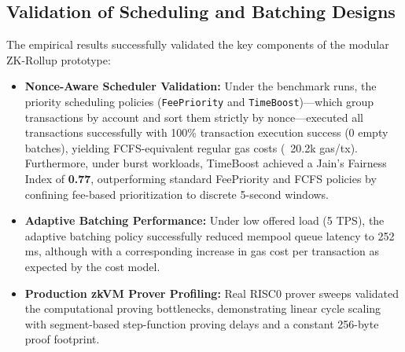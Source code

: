 \subsection{Validation of Scheduling and Batching Designs}
The empirical results successfully validated the key components of the modular ZK-Rollup prototype:
\begin{itemize}
    \item \textbf{Nonce-Aware Scheduler Validation:} Under the benchmark runs, the priority scheduling policies (\texttt{FeePriority} and \texttt{TimeBoost})—which group transactions by account and sort them strictly by nonce—executed all transactions successfully with 100\% transaction execution success (0 empty batches), yielding FCFS-equivalent regular gas costs (~20.2k gas/tx). Furthermore, under burst workloads, TimeBoost achieved a Jain's Fairness Index of \textbf{0.77}, outperforming standard FeePriority and FCFS policies by confining fee-based prioritization to discrete 5-second windows.
    \item \textbf{Adaptive Batching Performance:} Under low offered load (5 TPS), the adaptive batching policy successfully reduced mempool queue latency to 252 ms, although with a corresponding increase in gas cost per transaction as expected by the cost model.
    \item \textbf{Production zkVM Prover Profiling:} Real RISC0 prover sweeps validated the computational proving bottlenecks, demonstrating linear cycle scaling with segment-based step-function proving delays and a constant 256-byte proof footprint.
\end{itemize}
